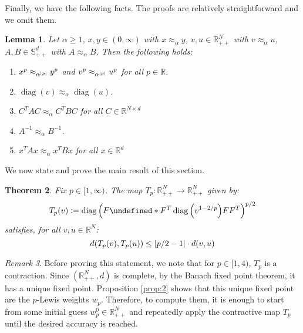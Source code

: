 \documentclass{article}
\theoremstyle{plain}
\newtheorem{lemma}{Lemma}
\newtheorem{theorem}[lemma]{Theorem}
\theoremstyle{definition}
\theoremstyle{remark}
\newtheorem{remark}[lemma]{Remark}
\newcommand{\defeq}{\vcentcolon=}
\let\brace\undefined
\DeclarePairedDelimiter{\brace}{\lbrace}{\rbrace}
\DeclarePairedDelimiter{\paren}{\lparen}{\rparen}
\newcommand{\R}{\mathbb{R}}
\DeclarePairedDelimiter{\abs}{\lvert}{\rvert}
\DeclareMathOperator{\diag}{diag}
\begin{document}
Finally, we have the following facts. The proofs are relatively straightforward and we omit them.
\begin{lemma}
    \label{lem:8}
    Let $\alpha \geq 1$, $x, y \in (0,\infty)$ with $x \approx_{\alpha} y$, $v, u \in \R_{++}^{N}$ with $v \approx_{\alpha} u$, $A, B \in \mathbb{S}_{++}^{d}$ with $A \approx_{\alpha} B$. Then the following holds:
    \begin{enumerate}
        \item $x^p \approx_{\alpha^{\abs{p}}} y^p$ and $v^{p} \approx_{\alpha^{\abs{p}}} u^p$ for all $p \in \R$.
        \item $\diag{(v)} \approx_{\alpha} \diag{(u)}$.
        \item $C^{T} A C \approx_{\alpha} C^{T} B C$ for all $C \in \R^{N \times d}$
        \item $A^{-1} \approx_{\alpha} B^{-1}$.
        \item $x^{T}Ax \approx_{\alpha} x^{T}Bx$ for all $x \in \R^{d}$
    \end{enumerate}
\end{lemma}
We now state and prove the main result of this section.
\begin{theorem}
    Fix $p \in [1, \infty)$. The map $T_p: \R^{N}_{++} \to \R^{N}_{++}$ given by:
    \begin{equation*}
        T_p(v) \defeq \diag{\paren*{F \brace*{F^{T} \diag{\paren*{v^{1-2/p}}F}}F^{T}}}^{p/2}
    \end{equation*}
    satisfies, for all $v, u \in \R^{N}$:
    \begin{equation*}
        d(T_p(v), T_p(u)) \leq \abs{p/2 - 1} \cdot d(v, u)
    \end{equation*}
\end{theorem}
\begin{remark}
    Before proving this statement, we note that for $p \in [1,4)$, $T_p$ is a contraction. Since $(\R_{++}^{N}, d)$ is complete, by the Banach fixed point theorem, it has a unique fixed point. Proposition \ref{prop:2} shows that this unique fixed point are the $p$-Lewis weights $w_p$. Therefore, to compute them, it is enough to start from some initial guess $w_p^{0} \in \R^{N}_{++}$ and repeatedly apply the contractive map $T_p$ until the desired accuracy is reached. 
\end{remark}
\end{document}
